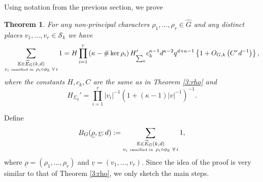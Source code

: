 \documentclass[12pt]{amsart}
\theoremstyle{plain}
\newtheorem{thm}{Theorem}
\begin{document}
Using notation from the previous section, we prove
\begin{thm} \label{4:rho} For any non-principal characters $\rho_1,\ldots,\rho_r \in \widehat{G}$ and any distinct places $v_1,\ldots,v_r \in {\mathcal{S}_k}$ we have
\[ \sum_{\substack{{{\mathbb K}} \in \widetilde{E}_G(k,d)\\
v_i \,\,\mbox{\tiny ramified in } \, \rho_i \circ {\phi_{{\mathbb K}}} \,\, \forall \, i}}1 =H\prod_{i=1}^r \left(\kappa-\# \ker \rho_i\right)  H_{_{\sum_0}}'c_k^{\kappa-1} d^{\kappa-2}q^{d+\kappa-1} \left\{1+O_{G,k}\left(C^rd^{-1}\right)\right\}, \]
where the constants $H,c_k,C$ are the same as in Theorem \ref{3:rho} and
\[H_{\Sigma_0}'=\prod_{i=1}^r|v_i|^{-1}\left(1+(\kappa-1)|v|^{-1}\right)^{-1}.\]
\end{thm}

 Define
\[{B_{G}({\underline{{\rho}}},{\underline{{v}}};d)}:=\sum_{\substack{{{\mathbb K}} \in \widetilde{E}_G(k,d)\\
v_i \,\,\mbox{\tiny ramified in } \, \rho_i \circ {\phi_{{\mathbb K}}} \,\, \forall \, i}}1,\]
where ${\underline{{\rho}}}=(\rho_1,\ldots,\rho_r)$ and ${\underline{{v}}}=(v_1,\ldots,v_r)$. Since the idea of the proof is very similar to that of Theorem \ref{3:rho}, we only sketch the main steps.
\end{document}
